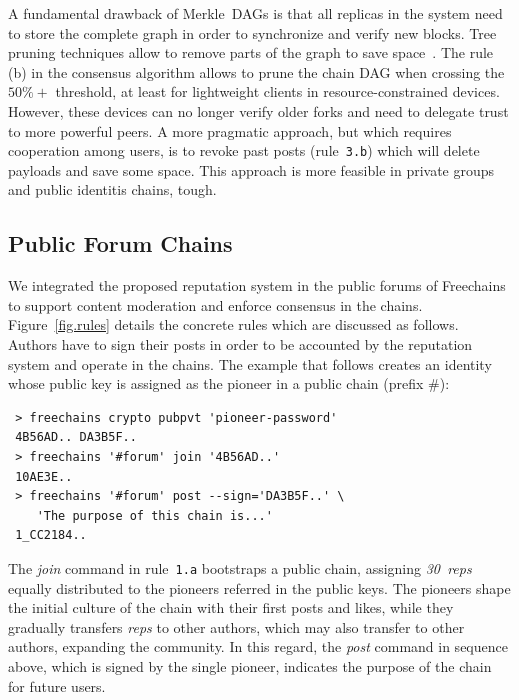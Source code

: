 \documentclass[10pt,journal,compsoc]{IEEEtran}
\newcommand{\FC}       {Freechains\xspace}
\newcommand{\reps}     {\emph{reps}\xspace}
\newcommand{\nreps}[1] {\emph{#1~reps\xspace}}
\begin{document}
A fundamental drawback of Merkle~DAGs is that all replicas in the system need
to store the complete graph in order to synchronize and verify new blocks.
Tree pruning techniques allow to remove parts of the graph to save
space~\cite{p2p.prune}.
The rule (b) in the consensus algorithm allows to prune the chain DAG when
crossing the $50\%+$ threshold, at least for lightweight clients in
resource-constrained devices.
However, these devices can no longer verify older forks and need to delegate
trust to more powerful peers.
%
A more pragmatic approach, but which requires cooperation among users, is to
revoke past posts (rule~\texttt{3.b}) which will delete payloads and save some
space.
This approach is more feasible in private groups and public identitis chains,
tough.

\subsection{Public Forum Chains}
\label{sec.consensus.chains}

We integrated the proposed reputation system in the public forums of \FC to
support content moderation and enforce consensus in the chains.
Figure~\ref{fig.rules} details the concrete rules which are discussed as
follows.
Authors have to sign their posts in order to be accounted by the reputation
system and operate in the chains.
The example that follows creates an identity whose public key is assigned as
the pioneer in a public chain (prefix $\#$):

{\footnotesize
\begin{verbatim}
 > freechains crypto pubpvt 'pioneer-password'
 4B56AD.. DA3B5F..
 > freechains '#forum' join '4B56AD..'
 10AE3E..
 > freechains '#forum' post --sign='DA3B5F..' \
    'The purpose of this chain is...'
 1_CC2184..
\end{verbatim}
}

The \emph{join} command in rule~\texttt{1.a} bootstraps a public chain,
assigning \nreps{30} equally distributed to the pioneers referred in the public
keys.
The pioneers shape the initial culture of the chain with their first posts and
likes, while they gradually transfers \reps to other authors, which may also
transfer to other authors, expanding the community.
%
In this regard, the \emph{post} command in sequence above, which is signed by
the single pioneer, indicates the purpose of the chain for future users.
\end{document}
